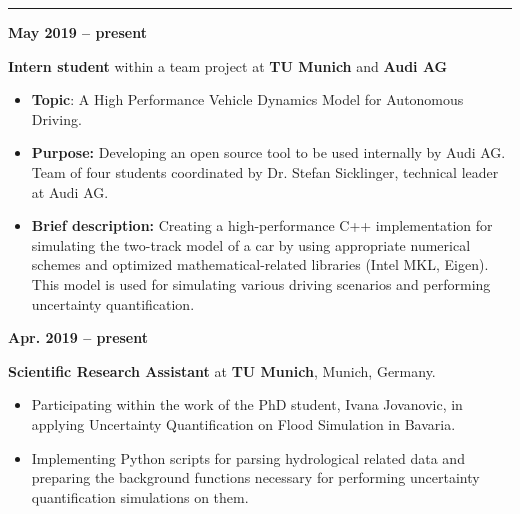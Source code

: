 \documentclass[a4paper,10pt]{article}
\newlength{\cvcolumngapwidth}
\newlength{\cvleftcolumnwidth}
\newlength{\cvrightcolumnwidth}
\newcommand{\cvsectionstyle}[1]{{\large\cvsectionfont\textcolor{cvsectioncolor}{#1}}}
\newcommand{\cvtitlestyle}[1]{{\large\cvtitlefont\textcolor{cvtitlecolor}{#1}}}
\newcommand{\cvdurationstyle}[1]{{\cvdurationfont\textcolor{cvdurationcolor}{#1}}}
\newlength{\cvafteritemskipamount}
\newlength{\cvaftersectionskipamount}
\newlength{\cvaftertitleskipamount}
\newlength{\cvparskip}
\newcommand{\cvsection}[1]{
    \begin{minipage}[t]{\cvleftcolumnwidth}
        \raggedleft\cvsectionstyle{#1}
    \end{minipage}%
    \hspace{\cvcolumngapwidth}%
    \begin{minipage}[t]{\cvrightcolumnwidth}
        \textcolor{cvrulecolor}{\rule{\cvrightcolumnwidth}{0.3mm}}
    \end{minipage}

    \vspace{\cvaftersectionskipamount}
}
\newcommand{\cvitem}[2]{
    \begin{minipage}[t]{\cvleftcolumnwidth}
        \raggedleft #1
    \end{minipage}%
    \hspace{\cvcolumngapwidth}%
    \begin{minipage}[t]{\cvrightcolumnwidth}
        \setlength{\parskip}{\cvparskip} #2
    \end{minipage}

    \vspace{\cvafteritemskipamount}
}
\newcommand{\cvtitle}[1]{
    \cvtitlestyle{#1}

    \vspace{\cvaftertitleskipamount}
    \vspace{-\cvparskip}
}
\begin{document}
\vspace{2cm}


\cvsection{WORK EXPERIENCE}


\cvitem{
    \cvdurationstyle{\textbf{May 2019 -- present}}
}{
    \cvtitle{\textbf{Intern student} within a team project at \textbf{TU Munich} and \textbf{Audi AG}}

    \begin{itemize}[leftmargin=*]
        \item \textbf{Topic}: A High Performance Vehicle Dynamics Model for Autonomous Driving.
        \item \textbf{Purpose:} Developing an open source tool to be used internally by Audi AG. \\
              Team of four students coordinated by Dr. Stefan Sicklinger, technical leader at  Audi AG.
        \item \textbf{Brief description:} Creating a high-performance C++ implementation for simulating the two-track model of a car by using appropriate numerical schemes and optimized mathematical-related libraries (Intel MKL, Eigen). This model is used for simulating various driving scenarios and performing uncertainty quantification.

    \end{itemize}
}

\cvitem{
    \cvdurationstyle{\textbf{Apr. 2019 -- present}}
}{
    \cvtitle{\textbf{Scientific Research Assistant} at \textbf{TU Munich}, Munich, Germany.}



    \begin{itemize}[leftmargin=*]
        \item Participating within the work of the PhD student, Ivana Jovanovic, in applying Uncertainty Quantification on Flood Simulation in Bavaria.
        \item Implementing Python scripts for parsing hydrological related data and preparing the background functions necessary for performing uncertainty quantification simulations on them.
    \end{itemize}
}
\end{document}
